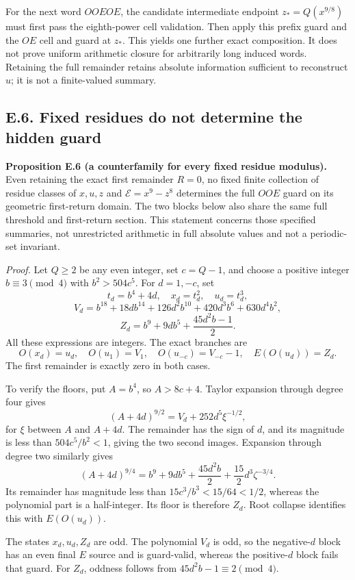 \documentclass[12pt]{article}
\begin{document}
For the next word \(OOEOE\), the candidate intermediate endpoint
\(z_*=Q(x^{9/8})\) must first pass the eighth-power cell validation.
Then apply this prefix guard and the \(OE\) cell and guard at \(z_*\).
This yields one further exact composition. It does not prove uniform
arithmetic closure for arbitrarily long induced words. Retaining the
full remainder retains absolute information sufficient to reconstruct
\(u\); it is not a finite-valued summary.

\subsection{E.6. Fixed residues do not determine the hidden
guard}\label{e.6.-fixed-residues-do-not-determine-the-hidden-guard}

\textbf{Proposition E.6 (a counterfamily for every fixed residue
modulus).} Even retaining the exact first remainder \(R=0\), no fixed
finite collection of residue classes of \(x,u,z\) and
\(\mathcal E=x^9-z^8\) determines the full \(OOE\) guard on its
geometric first-return domain. The two blocks below also share the same
full threshold and first-return section. This statement concerns those
specified summaries, not unrestricted arithmetic in full absolute values
and not a periodic-set invariant.

\emph{Proof.} Let \(Q\ge2\) be any even integer, set \(c=Q-1\), and
choose a positive integer \(b\equiv3\pmod4\) with \(b^2>504c^5\). For
\(d=1,-c\), set \[
t_d=b^4+4d,\quad x_d=t_d^2,\quad u_d=t_d^3,
\] \[
V_d=b^{18}+18db^{14}+126d^2b^{10}+420d^3b^6+630d^4b^2,
\] \[
Z_d=b^9+9db^5+\frac{45d^2b-1}{2}.
\] All these expressions are integers. The exact branches are \[
O(x_d)=u_d,\quad
O(u_1)=V_1,\quad O(u_{-c})=V_{-c}-1,\quad
E(O(u_d))=Z_d.
\] The first remainder is exactly zero in both cases.

To verify the floors, put \(A=b^4\), so \(A>8c+4\). Taylor expansion
through degree four gives \[
(A+4d)^{9/2}=V_d+252d^5\xi^{-1/2},
\] for \(\xi\) between \(A\) and \(A+4d\). The remainder has the sign of
\(d\), and its magnitude is less than \(504c^5/b^2<1\), giving the two
second images. Expansion through degree two similarly gives \[
(A+4d)^{9/4}
=b^9+9db^5+\frac{45d^2b}{2}
+\frac{15}{2}d^3\zeta^{-3/4}.
\] Its remainder has magnitude less than \(15c^3/b^3<15/64<1/2\),
whereas the polynomial part is a half-integer. Its floor is therefore
\(Z_d\). Root collapse identifies this with \(E(O(u_d))\).

The states \(x_d,u_d,Z_d\) are odd. The polynomial \(V_d\) is odd, so
the negative-\(d\) block has an even final \(E\) source and is
guard-valid, whereas the positive-\(d\) block fails that guard. For
\(Z_d\), oddness follows from \(45d^2b-1\equiv2\pmod4\).
\end{document}
